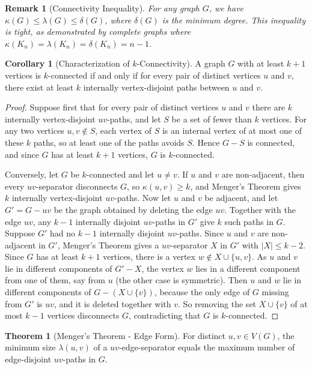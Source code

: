 \documentclass{article}
\newtheorem{remark}{Remark}
\theoremstyle{definition}
\newtheorem{theorem}{Theorem}
\newtheorem{corollary}{Corollary}
\begin{document}
\begin{remark}[Connectivity Inequality]
For any graph $G$, we have $\kappa(G) \leq \lambda(G) \leq \delta(G)$, where $\delta(G)$ is the minimum degree. This inequality is tight, as demonstrated by complete graphs where $\kappa(K_n) = \lambda(K_n) = \delta(K_n) = n-1$.
\end{remark}

\begin{corollary}[Characterization of $k$-Connectivity]
A graph $G$ with at least $k+1$ vertices is $k$-connected if and only if for every pair of distinct vertices $u$ and $v$, there exist at least $k$ internally vertex-disjoint paths between $u$ and $v$.
\end{corollary}

\begin{proof}
Suppose first that for every pair of distinct vertices $u$ and $v$ there are $k$ internally vertex-disjoint $uv$-paths, and let $S$ be a set of fewer than $k$ vertices. For any two vertices $u, v \notin S$, each vertex of $S$ is an internal vertex of at most one of these $k$ paths, so at least one of the paths avoids $S$. Hence $G - S$ is connected, and since $G$ has at least $k+1$ vertices, $G$ is $k$-connected.

Conversely, let $G$ be $k$-connected and let $u \neq v$. If $u$ and $v$ are non-adjacent, then every $uv$-separator disconnects $G$, so $\kappa(u,v) \geq k$, and Menger's Theorem gives $k$ internally vertex-disjoint $uv$-paths. Now let $u$ and $v$ be adjacent, and let $G' = G - uv$ be the graph obtained by deleting the edge $uv$. Together with the edge $uv$, any $k-1$ internally disjoint $uv$-paths in $G'$ give $k$ such paths in $G$. Suppose $G'$ had no $k-1$ internally disjoint $uv$-paths. Since $u$ and $v$ are non-adjacent in $G'$, Menger's Theorem gives a $uv$-separator $X$ in $G'$ with $|X| \leq k-2$. Since $G$ has at least $k+1$ vertices, there is a vertex $w \notin X \cup \{u,v\}$. As $u$ and $v$ lie in different components of $G' - X$, the vertex $w$ lies in a different component from one of them, say from $u$ (the other case is symmetric). Then $u$ and $w$ lie in different components of $G - (X \cup \{v\})$, because the only edge of $G$ missing from $G'$ is $uv$, and it is deleted together with $v$. So removing the set $X \cup \{v\}$ of at most $k-1$ vertices disconnects $G$, contradicting that $G$ is $k$-connected.
\end{proof}

\begin{theorem}[Menger's Theorem - Edge Form]
For distinct $u,v \in V(G)$, the minimum size $\lambda(u,v)$ of a $uv$-edge-separator equals the maximum number of edge-disjoint $uv$-paths in $G$.
\end{theorem}
\end{document}
